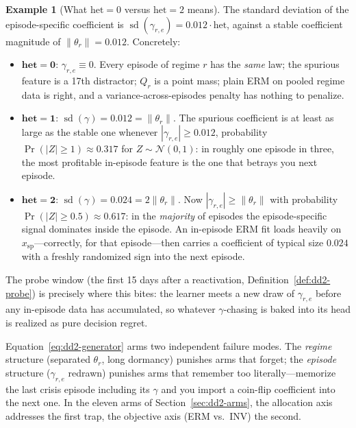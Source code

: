 \documentclass[11pt,a4paper]{article}
\theoremstyle{definition}
\newtheorem{example}{Example}[section]
\theoremstyle{plain}
\begin{document}
\begin{example}[What $\mathrm{het} = 0$ versus $\mathrm{het} = 2$ means]
\label{ex:dd2-het}
The standard deviation of the episode-specific coefficient is
$\operatorname{sd}(\gamma_{r,e}) = 0.012 \cdot \mathrm{het}$, against a stable
coefficient magnitude of $\|\theta_r\| = 0.012$. Concretely:
\begin{itemize}
  \item $\mathbf{het = 0}$: $\gamma_{r,e} \equiv 0$. Every episode of regime
        $r$ has the \emph{same} law; the spurious feature is a 17th
        distractor; $Q_r$ is a point mass; plain ERM on pooled regime data
        is right, and a variance-across-episodes penalty has nothing to
        penalize.
  \item $\mathbf{het = 1}$: $\operatorname{sd}(\gamma) = 0.012 = \|\theta_r\|$.
        The spurious coefficient is at least as large as the stable one
        whenever $|\gamma_{r,e}| \ge 0.012$, probability
        $\Pr(|Z| \ge 1) \approx 0.317$ for $Z \sim \mathcal{N}(0,1)$: in
        roughly one episode in three, the most profitable in-episode feature
        is the one that betrays you next episode.
  \item $\mathbf{het = 2}$: $\operatorname{sd}(\gamma) = 0.024 = 2\|\theta_r\|$.
        Now $|\gamma_{r,e}| \ge \|\theta_r\|$ with probability
        $\Pr(|Z| \ge 0.5) \approx 0.617$: in the \emph{majority} of episodes
        the episode-specific signal dominates inside the episode. An
        in-episode ERM fit loads heavily on $x_{\mathrm{sp}}$---correctly,
        for that episode---then carries a coefficient of typical size
        $0.024$ with a freshly randomized sign into the next episode.
\end{itemize}
The probe window (the first 15 days after a reactivation,
Definition~\ref{def:dd2-probe}) is precisely where this bites: the learner
meets a new draw of $\gamma_{r,e}$ before any in-episode data has
accumulated, so whatever $\gamma$-chasing is baked into its head is realized
as pure decision regret.
\end{example}

\begin{intuition}[title={The generator is a forgetting--overfitting double trap}]
Equation~\eqref{eq:dd2-generator} arms two independent failure modes. The
\emph{regime} structure (separated $\theta_r$, long dormancy) punishes arms
that forget; the \emph{episode} structure ($\gamma_{r,e}$ redrawn) punishes
arms that remember too literally---memorize the last crisis episode including
its $\gamma$ and you import a coin-flip coefficient into the next one. In the
eleven arms of Section~\ref{sec:dd2-arms}, the allocation axis addresses the
first trap, the objective axis (ERM vs.\ INV) the second.
\end{intuition}
\end{document}
